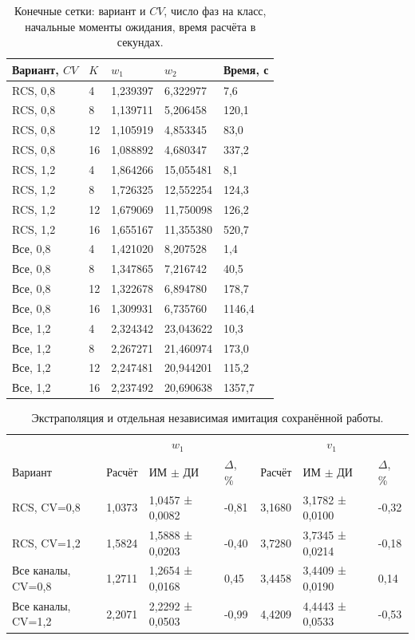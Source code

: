 \documentclass[a4paper,12pt]{article}
\begin{document}
\begin{table}[!htbp]
\centering\small\setlength{\tabcolsep}{2pt}
\begin{tabular}{@{}p{4.44cm}p{1.13cm}p{3.31cm}p{3.31cm}p{2.46cm}@{}}
\toprule
Вариант, $CV$ & $K$ & $w_1$ & $w_2$ & Время, с \\
\midrule
RCS, 0,8 & 4 & 1,239397 & 6,322977 & 7,6 \\
RCS, 0,8 & 8 & 1,139711 & 5,206458 & 120,1 \\
RCS, 0,8 & 12 & 1,105919 & 4,853345 & 83,0 \\
RCS, 0,8 & 16 & 1,088892 & 4,680347 & 337,2 \\
RCS, 1,2 & 4 & 1,864266 & 15,055481 & 8,1 \\
RCS, 1,2 & 8 & 1,726325 & 12,552254 & 124,3 \\
RCS, 1,2 & 12 & 1,679069 & 11,750098 & 126,2 \\
RCS, 1,2 & 16 & 1,655167 & 11,355380 & 520,7 \\
Все, 0,8 & 4 & 1,421020 & 8,207528 & 1,4 \\
Все, 0,8 & 8 & 1,347865 & 7,216742 & 40,5 \\
Все, 0,8 & 12 & 1,322678 & 6,894780 & 178,7 \\
Все, 0,8 & 16 & 1,309931 & 6,735760 & 1146,4 \\
Все, 1,2 & 4 & 2,324342 & 23,043622 & 10,3 \\
Все, 1,2 & 8 & 2,267271 & 21,460974 & 173,0 \\
Все, 1,2 & 12 & 2,247481 & 20,944201 & 115,2 \\
Все, 1,2 & 16 & 2,237492 & 20,690638 & 1357,7 \\
\bottomrule
\end{tabular}
\caption{Конечные сетки: вариант и \(CV\), число фаз на класс, начальные моменты ожидания, время расчёта в секундах.}
\label{tab:grids}
\end{table}

\begin{table}[!htbp]
\centering\small\setlength{\tabcolsep}{2pt}
\begin{tabular}{@{}p{4.16cm}p{1.61cm}p{2.83cm}p{1.28cm}p{1.61cm}p{2.83cm}p{1.28cm}@{}}
\toprule
 & \multicolumn{3}{c}{$w_1$} & \multicolumn{3}{c}{$v_1$} \\
Вариант & Расчёт & ИМ $\pm$ ДИ & $\Delta$, \% & Расчёт & ИМ $\pm$ ДИ & $\Delta$, \% \\
\midrule
RCS, CV=0,8 & 1,0373 & 1,0457 ± 0,0082 & -0,81 & 3,1680 & 3,1782 ± 0,0100 & -0,32 \\
RCS, CV=1,2 & 1,5824 & 1,5888 ± 0,0203 & -0,40 & 3,7280 & 3,7345 ± 0,0214 & -0,18 \\
Все каналы, CV=0,8 & 1,2711 & 1,2654 ± 0,0168 & 0,45 & 3,4458 & 3,4409 ± 0,0190 & 0,14 \\
Все каналы, CV=1,2 & 2,2071 & 2,2292 ± 0,0503 & -0,99 & 4,4209 & 4,4443 ± 0,0533 & -0,53 \\
\bottomrule
\end{tabular}
\caption{Экстраполяция и отдельная независимая имитация сохранённой работы.}
\label{tab:extrap}
\end{table}
\end{document}
